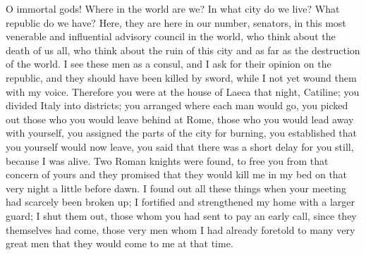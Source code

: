 {  O immortal gods! Where in the world are we? In what city do we live? What republic do we have? Here, they are here in our number, senators, in this most venerable and influential advisory council in the world, who think about the death of us all, who think about the ruin of this city and as far as the destruction of the world. I see these men as a consul, and I ask for their opinion on the republic, and they should have been killed by sword, while I not yet wound them with my voice. Therefore you were at the house of Laeca that night, Catiline; you divided Italy into districts; you arranged where each man would go, you picked out those who you would leave behind at Rome, those who you would lead away with yourself, you assigned the parts of the city for burning, you established that you yourself would now leave, you said that there was a short delay for you still, because I was alive. Two Roman knights were found, to free you from that concern of yours and they promised that they would kill me in my bed on that very night a little before dawn. I found out all these things when your meeting had scarcely been broken up; I fortified and strengthened my home with a larger guard; I shut them out, those whom you had sent to pay an early call, since they themselves had come, those very men whom I had already foretold to many very great men that they would come to me at that time.
}
